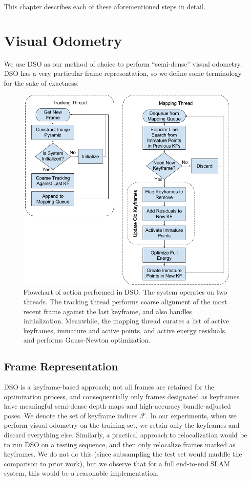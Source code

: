 This chapter describes each of these aforementioned steps in detail.

\section{Visual Odometry}

We use DSO \cite{engel2017direct} as our method of choice to perform ``semi-dense'' visual odometry. DSO has a very particular frame representation, so we define some terminology for the sake of exactness.

\begin{figure}[h]
	\centering
	\includegraphics[width=\linewidth]{methodology/dso_pipeline.png}
	\caption{Flowchart of action performed in DSO. The system operates on two threads. The tracking thread performs coarse alignment of the most recent frame against the last keyframe, and also handles initialization. Meanwhile, the mapping thread curates a list of active keyframes, immature and active points, and active energy residuals, and performs Gauss-Newton optimization.}
	\label{fig:dso_pipeline}
\end{figure}

\subsection{Frame Representation}

DSO is a keyframe-based approach; not all frames are retained for the optimization process, and consequentially only frames designated as keyframes have meaningful semi-dense depth maps and high-accuracy bundle-adjusted poses. We denote the set of keyframe indices $\mathcal{F}$. In our experiments, when we perform visual odometry on the training set, we retain only the keyframes and discard everything else. Similarly, a practical approach to relocalization would be to run DSO on a testing sequence, and then only relocalize frames marked as keyframes. We do not do this (since subsampling the test set would muddle the comparison to prior work), but we observe that for a full end-to-end SLAM system, this would be a reasonable implementation.

